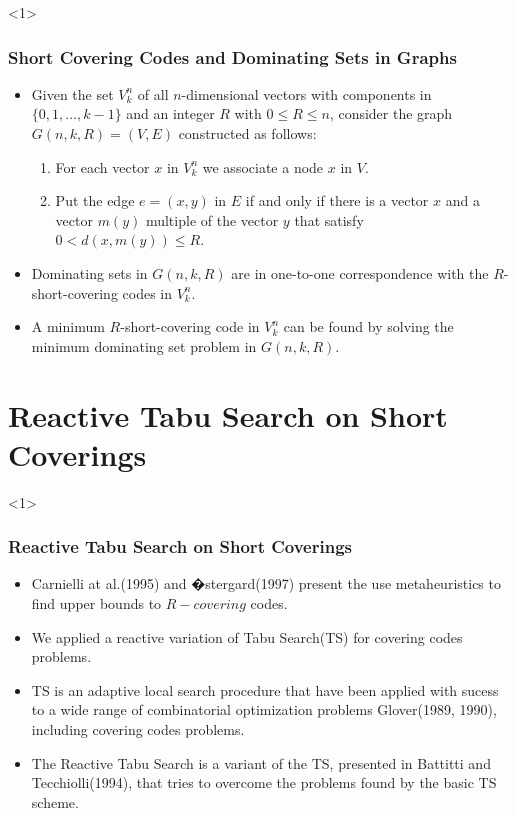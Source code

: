 \documentclass{beamer}
\begin{document}
\begin{frame}<1>
  \frametitle{Short Covering Codes and Dominating Sets in Graphs}
{

\begin{itemize}
	
	\item Given the set $V_k^n$ of all $n$-dimensional vectors with components in $\{ 0,
1,\ldots,k-1 \}$ and an integer $R$ with $0 \leq R \leq n$, consider the graph $G(n,k,R)=(V,E)$ constructed as follows:
	\begin{enumerate}
		\item For each vector $x$ in $V_k^n$ we associate a node $x$ in $V$.
		\item Put the edge $e=(x,y)$ in $E$ if and only if there is a vector $x$ and a vector $m(y)$ multiple of the vector $y$ that satisfy $0 < d(x,m(y)) \leq R$. 
	\end{enumerate}

	\item Dominating sets in $G(n,k,R)$ are in one-to-one correspondence with the $R$-short-covering codes in $V_k^n$. 
	\item A minimum $R$-short-covering code in $V_k^n$ can be found by solving the minimum dominating set problem in $G(n,k,R)$.
	
\end{itemize}

}
\end{frame}


\section{Reactive Tabu Search on Short Coverings}

\begin{frame}<1>
  \frametitle{Reactive Tabu Search on Short Coverings}

{%
  \begin{itemize}
  
		\item Carnielli at al.(1995) and �stergard(1997) present the use metaheuristics to find upper bounds to $R-covering$ codes. 		\item We applied a reactive variation of Tabu Search(TS) for covering codes problems.
		\item TS is an adaptive local search procedure that have been applied with sucess to a wide range of combinatorial optimization problems Glover(1989, 1990), including covering codes problems.
		\item The Reactive Tabu Search is a variant of the TS, presented in Battitti and
Tecchiolli(1994), that tries to overcome the problems found by the basic TS scheme. 

  \end{itemize}
}
\end{frame}
\end{document}
